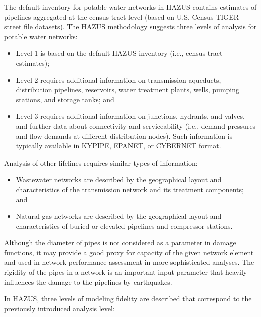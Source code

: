 The default inventory for potable water networks in HAZUS contains estimates of pipelines aggregated at the census tract level (based on U.S. Census TIGER street file datasets). The HAZUS methodology suggests three levels of analysis for potable water networks:

\begin{itemize}
    \item Level 1 is based on the default HAZUS inventory (i.e., census tract estimates);
        \vspace{2mm}
    \item Level 2 requires additional information on transmission aqueducts, distribution pipelines, reservoirs, water treatment plants, wells, pumping stations, and storage tanks; and 
        \vspace{2mm}
    \item Level 3 requires additional information on junctions, hydrants, and valves, and further data about connectivity and serviceability (i.e., demand pressures and flow demands at different distribution nodes). Such information is typically available in KYPIPE, EPANET, or CYBERNET format.
\end{itemize}

\noindent Analysis of other lifelines requires similar types of information:

\begin{itemize}
    \item Wastewater networks are described by the geographical layout and characteristics of the transmission network and its treatment components; and
        \vspace{2mm}
    \item Natural gas networks are described by the geographical layout and characteristics of buried or elevated pipelines and compressor stations.
\end{itemize}

Although the diameter of pipes is not considered as a parameter in damage functions, it may provide a good proxy for capacity of the given network element and used in network performance assessment in more sophisticated analyses. The rigidity of the pipes in a network is an important input parameter that heavily influences the damage to the pipelines by earthquakes. 

\noindent In HAZUS, three levels of modeling fidelity are described that correspond to the previously introduced analysis level: 


